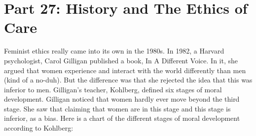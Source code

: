 \chapter{Part 27: History and The Ethics of Care}

Feminist ethics really came into its own in the 1980s. In 1982, a Harvard psychologist, Carol Gilligan published a book, In A Different Voice. In it, she argued that women experience and interact with the world differently than men (kind of a no-duh). But the difference was that she rejected the idea that this was inferior to men. Gilligan’s teacher, Kohlberg, defined six stages of moral development. Gilligan noticed that women hardly ever move beyond the third stage. She saw that claiming that women are in this stage and this stage is inferior, as a bias. Here is a chart of the different stages of moral development according to Kohlberg:

